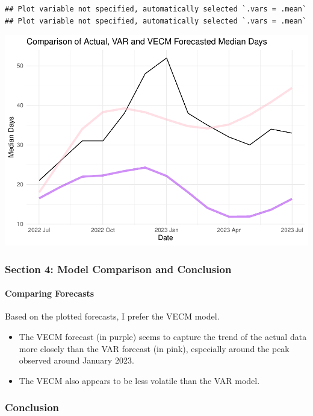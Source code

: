 \documentclass[
]{article}
\begin{document}
\begin{verbatim}
## Plot variable not specified, automatically selected `.vars = .mean`
## Plot variable not specified, automatically selected `.vars = .mean`
\end{verbatim}

\includegraphics{Montgomery_Rachel_Assignment6_files/figure-latex/unnamed-chunk-15-1.pdf}

\hypertarget{section-4-model-comparison-and-conclusion}{%
\subsubsection{Section 4: Model Comparison and
Conclusion}\label{section-4-model-comparison-and-conclusion}}

\hypertarget{comparing-forecasts}{%
\paragraph{Comparing Forecasts}\label{comparing-forecasts}}

Based on the plotted forecasts, I prefer the VECM model.

\begin{itemize}
\item
  The VECM forecast (in purple) seems to capture the trend of the actual
  data more closely than the VAR forecast (in pink), especially around
  the peak observed around January 2023.
\item
  The VECM also appears to be less volatile than the VAR model.
\end{itemize}

\hypertarget{conclusion}{%
\subsubsection{Conclusion}\label{conclusion}}
\end{document}
